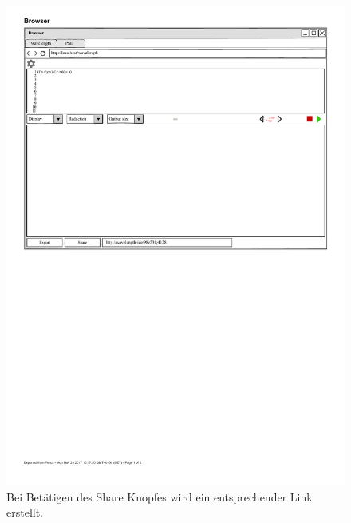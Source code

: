 \documentclass[parskip=full,11pt,twoside]{scrartcl}
\begin{document}
\begin{figure}[H]
	\centering
	\includegraphics{img/share}
	\caption{Bei Betätigen des Share Knopfes wird ein entsprechender Link erstellt.}
	\label{img:share}
\end{figure}
\end{document}
